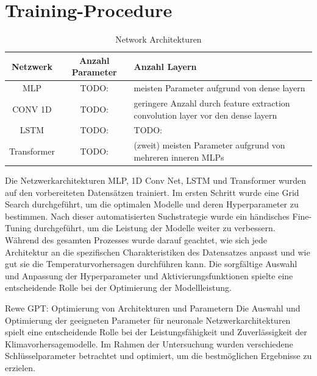 \documentclass[manuscript,screen,review]{acmart}
\begin{document}
\section{Training-Procedure}

\begin{table}
  \caption{Network Architekturen}
  \label{tab:freq}
  \begin{tabular}{ccl}
    \toprule
    Netzwerk&Anzahl Parameter&Anzahl Layern\\
    \midrule
    MLP & TODO: & meisten Parameter aufgrund von dense layern\\
    CONV 1D & TODO: & geringere Anzahl durch feature extraction convolution layer vor den dense layern\\
    LSTM & TODO: & TODO:\\
    Transformer & TODO: & (zweit) meisten Parameter aufgrund von mehreren inneren MLPs\\
  \bottomrule
\end{tabular}
\end{table}

Die Netzwerkarchitekturen MLP, 1D Conv Net, LSTM und Transformer wurden auf den vorbereiteten Datensätzen trainiert. 
Im ersten Schritt wurde eine Grid Search durchgeführt, um die optimalen Modelle und deren Hyperparameter zu bestimmen. 
Nach dieser automatisierten Suchstrategie wurde ein händisches Fine-Tuning durchgeführt, um die Leistung der Modelle weiter zu verbessern. 
Während des gesamten Prozesses wurde darauf geachtet, wie sich jede Architektur an die spezifischen Charakteristiken des Datensatzes anpasst und 
wie gut sie die Temperaturvorhersagen durchführen kann. 
Die sorgfältige Auswahl und Anpassung der Hyperparameter und Aktivierungsfunktionen spielte eine entscheidende Rolle bei der Optimierung der Modellleistung.

Rewe GPT:
Optimierung von Architekturen und Parametern
Die Auswahl und Optimierung der geeigneten Parameter für neuronale Netzwerkarchitekturen spielt eine entscheidende Rolle bei der Leistungsfähigkeit und Zuverlässigkeit der Klimavorhersagemodelle. 
Im Rahmen der Untersuchung wurden verschiedene Schlüsselparameter betrachtet und optimiert, um die bestmöglichen Ergebnisse zu erzielen.
\end{document}
